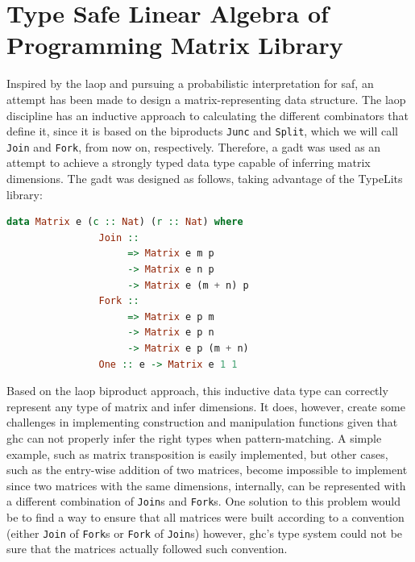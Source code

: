 \documentclass[
  oneside,
  11pt, a4paper,
  footinclude=true,
  headinclude=true,
  cleardoublepage=empty
]{scrbook}
\theoremstyle{definition}
\theoremstyle{definition}
\begin{document}
	    \section{Type Safe Linear Algebra of Programming Matrix Library}\label{sec-laop-lib1}
	    
	    Inspired by the \gls{laop} and pursuing a probabilistic interpretation for \gls{saf}, an attempt has been made to design a matrix-representing data structure. The \gls{laop} discipline has an inductive approach to calculating the different combinators that define it, since it is based on the biproducts \texttt{Junc} and \texttt{Split}, which we will call \texttt{Join} and \texttt{Fork}, from now on, respectively. Therefore, a \gls{gadt} was used as an attempt to achieve a strongly typed data type capable of inferring matrix dimensions. The \gls{gadt} was designed as follows, taking advantage of the TypeLits library:
	    
        \begin{lstlisting}[language=Haskell, label={lst:nat-matrix}, caption={Inductive matrix definition},captionpos=b]
            data Matrix e (c :: Nat) (r :: Nat) where
                Join :: 
                     => Matrix e m p 
                     -> Matrix e n p 
                     -> Matrix e (m + n) p
                Fork ::
                     => Matrix e p m 
                     -> Matrix e p n 
                     -> Matrix e p (m + n)
                One :: e -> Matrix e 1 1
        \end{lstlisting}{}
        
        Based on the \gls{laop} biproduct approach, this inductive data type can correctly represent any type of matrix and infer dimensions. It does, however, create some challenges in implementing construction and manipulation functions given that \gls{ghc} can not properly infer the right types when pattern-matching. A simple example, such as matrix transposition is easily implemented, but other cases, such as the entry-wise addition of two matrices, become impossible to implement since two matrices with the same dimensions, internally, can be represented with a different combination of \texttt{Join}s and \texttt{Fork}s. One solution to this problem would be to find a way to ensure that all matrices were built according to a convention (either \texttt{Join} of \texttt{Fork}s or \texttt{Fork} of \texttt{Join}s) however, \gls{ghc}'s type system could not be sure that the matrices actually followed such convention.
	    
\end{document}
